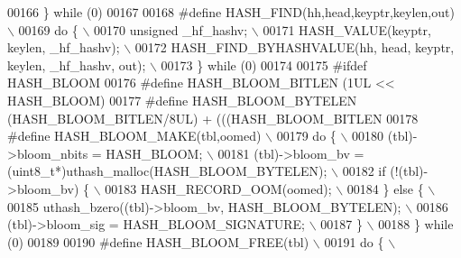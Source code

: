 \begin{DoxyCode}
00166 \textcolor{preprocessor}{\} while (0)}
00167 
00168 \textcolor{preprocessor}{#define HASH\_FIND(hh,head,keyptr,keylen,out)                                     \(\backslash\)}
00169 \textcolor{preprocessor}{do \{                                                                             \(\backslash\)}
00170 \textcolor{preprocessor}{  unsigned \_hf\_hashv;                                                            \(\backslash\)}
00171 \textcolor{preprocessor}{  HASH\_VALUE(keyptr, keylen, \_hf\_hashv);                                         \(\backslash\)}
00172 \textcolor{preprocessor}{  HASH\_FIND\_BYHASHVALUE(hh, head, keyptr, keylen, \_hf\_hashv, out);               \(\backslash\)}
00173 \textcolor{preprocessor}{\} while (0)}
00174 
00175 \textcolor{preprocessor}{#ifdef HASH\_BLOOM}
00176 \textcolor{preprocessor}{#define HASH\_BLOOM\_BITLEN (1UL << HASH\_BLOOM)}
00177 \textcolor{preprocessor}{#define HASH\_BLOOM\_BYTELEN (HASH\_BLOOM\_BITLEN/8UL) + (((HASH\_BLOOM\_BITLEN%
00178 \textcolor{preprocessor}{#define HASH\_BLOOM\_MAKE(tbl,oomed)                                               \(\backslash\)}
00179 \textcolor{preprocessor}{do \{                                                                             \(\backslash\)}
00180 \textcolor{preprocessor}{  (tbl)->bloom\_nbits = HASH\_BLOOM;                                               \(\backslash\)}
00181 \textcolor{preprocessor}{  (tbl)->bloom\_bv = (uint8\_t*)uthash\_malloc(HASH\_BLOOM\_BYTELEN);                 \(\backslash\)}
00182 \textcolor{preprocessor}{  if (!(tbl)->bloom\_bv) \{                                                        \(\backslash\)}
00183 \textcolor{preprocessor}{    HASH\_RECORD\_OOM(oomed);                                                      \(\backslash\)}
00184 \textcolor{preprocessor}{  \} else \{                                                                       \(\backslash\)}
00185 \textcolor{preprocessor}{    uthash\_bzero((tbl)->bloom\_bv, HASH\_BLOOM\_BYTELEN);                           \(\backslash\)}
00186 \textcolor{preprocessor}{    (tbl)->bloom\_sig = HASH\_BLOOM\_SIGNATURE;                                     \(\backslash\)}
00187 \textcolor{preprocessor}{  \}                                                                              \(\backslash\)}
00188 \textcolor{preprocessor}{\} while (0)}
00189 
00190 \textcolor{preprocessor}{#define HASH\_BLOOM\_FREE(tbl)                                                     \(\backslash\)}
00191 \textcolor{preprocessor}{do \{                                                                             \(\backslash\)}
}
\end{DoxyCode}
